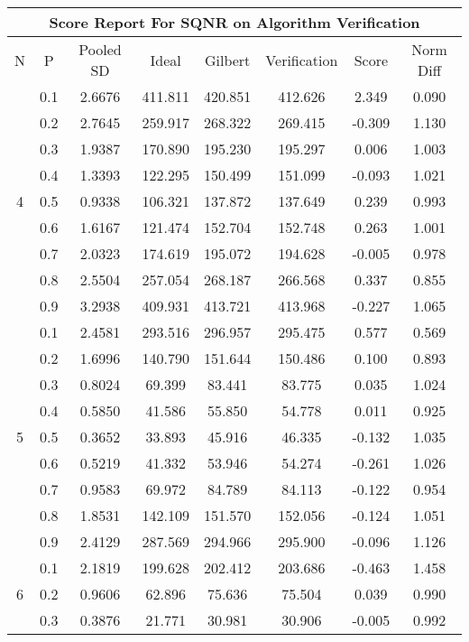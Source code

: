 \documentclass[11pt,a4paper]{report}
\begin{document}
\begin{longtable}{ | c | c || c | c | c | c | c | c | }
\hline
\multicolumn{8}{|c|}{ Score Report For SQNR on Algorithm Verification} \\
\hline
N & P & Pooled SD &  Ideal &  Gilbert & Verification  & Score & Norm Diff \\
 \hline
 \hline
 \endhead
\multirow{9}{*}{4} & 0.1 & 2.6676 & 411.811 & 420.851 & 412.626 & 2.349 & 0.090 \\
 & 0.2 & 2.7645 & 259.917 & 268.322 & 269.415 & -0.309 & 1.130 \\
 & 0.3 & 1.9387 & 170.890 & 195.230 & 195.297 & 0.006 & 1.003 \\
 & 0.4 & 1.3393 & 122.295 & 150.499 & 151.099 & -0.093 & 1.021 \\
 & 0.5 & 0.9338 & 106.321 & 137.872 & 137.649 & 0.239 & 0.993 \\
 & 0.6 & 1.6167 & 121.474 & 152.704 & 152.748 & 0.263 & 1.001 \\
 & 0.7 & 2.0323 & 174.619 & 195.072 & 194.628 & -0.005 & 0.978 \\
 & 0.8 & 2.5504 & 257.054 & 268.187 & 266.568 & 0.337 & 0.855 \\
 & 0.9 & 3.2938 & 409.931 & 413.721 & 413.968 & -0.227 & 1.065 \\
 \hline
\multirow{9}{*}{5} & 0.1 & 2.4581 & 293.516 & 296.957 & 295.475 & 0.577 & 0.569 \\
 & 0.2 & 1.6996 & 140.790 & 151.644 & 150.486 & 0.100 & 0.893 \\
 & 0.3 & 0.8024 & 69.399 & 83.441 & 83.775 & 0.035 & 1.024 \\
 & 0.4 & 0.5850 & 41.586 & 55.850 & 54.778 & 0.011 & 0.925 \\
 & 0.5 & 0.3652 & 33.893 & 45.916 & 46.335 & -0.132 & 1.035 \\
 & 0.6 & 0.5219 & 41.332 & 53.946 & 54.274 & -0.261 & 1.026 \\
 & 0.7 & 0.9583 & 69.972 & 84.789 & 84.113 & -0.122 & 0.954 \\
 & 0.8 & 1.8531 & 142.109 & 151.570 & 152.056 & -0.124 & 1.051 \\
 & 0.9 & 2.4129 & 287.569 & 294.966 & 295.900 & -0.096 & 1.126 \\
 \hline
\multirow{9}{*}{6} & 0.1 & 2.1819 & 199.628 & 202.412 & 203.686 & -0.463 & 1.458 \\
 & 0.2 & 0.9606 & 62.896 & 75.636 & 75.504 & 0.039 & 0.990 \\
 & 0.3 & 0.3876 & 21.771 & 30.981 & 30.906 & -0.005 & 0.992 \\

\end{longtable}
\end{document}
